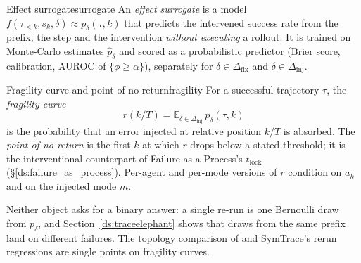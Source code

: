 \begin{definition}{Effect surrogate}{surrogate}
An \emph{effect surrogate} is a model $f(\tau_{<k},s_k,\delta)\approx p_\delta(\tau,k)$ that predicts the intervened success rate from the prefix, the step and the intervention \emph{without executing} a rollout. It is trained on Monte-Carlo estimates $\hat p_\delta$ and scored as a probabilistic predictor (Brier score, calibration, AUROC of $\{\phi\ge\alpha\}$), separately for $\delta\in\Delta_{\mathrm{fix}}$ and $\delta\in\Delta_{\mathrm{inj}}$.
\end{definition}

\begin{definition}{Fragility curve and point of no return}{fragility}
For a successful trajectory $\tau$, the \emph{fragility curve}
\[r(k/T)=\mathbb{E}_{\delta\in\Delta_{\mathrm{inj}}}\,p_\delta(\tau,k)\]
is the probability that an error injected at relative position $k/T$ is absorbed. The \emph{point of no return} is the first $k$ at which $r$ drops below a stated threshold; it is the interventional counterpart of Failure-as-a-Process's $t_{\mathrm{lock}}$ (\S\ref{ds:failure_as_process}). Per-agent and per-mode versions of $r$ condition on $a_k$ and on the injected mode $m$.
\end{definition}

Neither object asks for a binary answer: a single re-run is one Bernoulli draw from $p_\delta$, and Section~\ref{ds:traceelephant} shows that draws from the same prefix land on different failures. The topology comparison of \citet{huang2024resilience} and SymTrace's rerun regressions \cite{luan2026symtrace} are single points on fragility curves.

